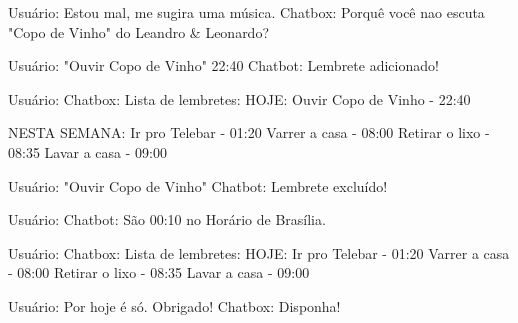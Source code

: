 Usuário: Estou mal, me sugira uma música.
Chatbox: Porquê você nao escuta "Copo de Vinho" do Leandro & Leonardo?

Usuário: \addlembrete "Ouvir Copo de Vinho" 22:40
Chatbot: Lembrete adicionado!

Usuário: \listalembrete
Chatbox: Lista de lembretes:
	HOJE:
	Ouvir Copo de Vinho - 22:40

	NESTA SEMANA:
	Ir pro Telebar - 01:20
	Varrer a casa - 08:00
	Retirar o lixo - 08:35
	Lavar a casa - 09:00

Usuário: \excluilembrete "Ouvir Copo de Vinho"
Chatbot: Lembrete excluído!

Usuário: \horas
Chatbot: São 00:10 no Horário de Brasília.

Usuário: \listalembrete
Chatbox: Lista de lembretes:
	HOJE:
	Ir pro Telebar - 01:20
	Varrer a casa - 08:00
	Retirar o lixo - 08:35
	Lavar a casa - 09:00

Usuário: Por hoje é só. Obrigado!
Chatbox: Disponha!
